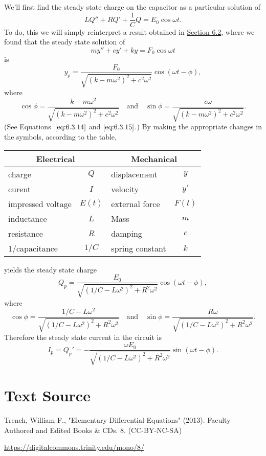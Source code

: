 \documentclass{ximera}
\begin{document}
\begin{example}
\begin{center}
\begin{tikzpicture}[scale=1]
\end{tikzpicture}
\end{center}


\begin{explanation}
We'll first find the steady state charge on the capacitor as
a particular solution of
$$
LQ''+RQ'+\frac{1}{C}Q=E_0\cos\omega t.
$$
To do, this we will simply reinterpret a result obtained in
\href{https://xerxes.ximera.org/differentialequations/main/springProblemsII/springProblemsII}{Section 6.2}, where we found that the steady state solution of
$$
my''+cy'+ky=F_0\cos\omega t
$$
is
$$
y_p=\frac{F_0}{\sqrt{(k-m\omega^2)^2+c^2\omega^2}}
\cos(\omega t-\phi),
$$
where
$$
\cos\phi=\frac{k-m\omega^2}{\sqrt
{(k-m\omega^2)^2+c^2\omega^2}}\quad\mbox{and}\quad
\sin\phi=\frac{c\omega}{\sqrt{(k-m\omega^2)^2+c^2\omega^2}}.
$$
(See Equations~$\eqref{eq:6.3.14}$ and $\eqref{eq:6.3.15}$.) By making the
appropriate changes in the symbols, according to the table,

\begin{center}
\begin{tabular}{|lc|lc|}\hline
\multicolumn{2}{|c|}{\bf Electrical}&
\multicolumn{2}{c|}{\bf Mechanical}\\\hline
charge& $Q$& displacement&$y$\\\hline
curent&$I$&velocity&$y'$\\\hline
impressed voltage&$E(t)$&external force&$F(t)$\\\hline
inductance&$L$&Mass&$m$\\\hline
resistance&$R$&damping&$c$\\\hline
1/capacitance&$1/C$&spring constant&$k$\\\hline
\end{tabular}
\end{center}

yields the steady state charge
$$
Q_p=\frac{E_0}{\sqrt{(1/C-L\omega^2)^2+R^2\omega^2}}\cos(\omega
t-\phi),
$$
where
$$
\cos\phi=\frac{1/C-L\omega^2}{\sqrt{(1/C-L\omega^2)^2+R^2\omega^2}}
\quad\mbox{and}\quad
\sin\phi=\frac{R\omega}{\sqrt{(1/C-L\omega^2)^2+R^2\omega^2}}.
$$
 Therefore the steady state current in the circuit
is
$$
I_p=Q_p'=
-\frac{\omega E_0}{\sqrt{(1/C-L\omega^2)^2+R^2\omega^2}}\sin(\omega
t-\phi).
$$
\end{explanation}
\end{example}
\section*{Text Source}
Trench, William F., "Elementary Differential Equations" (2013). Faculty Authored and Edited Books \& CDs. 8. (CC-BY-NC-SA)

\href{https://digitalcommons.trinity.edu/mono/8/}{https://digitalcommons.trinity.edu/mono/8/}
\end{document}
